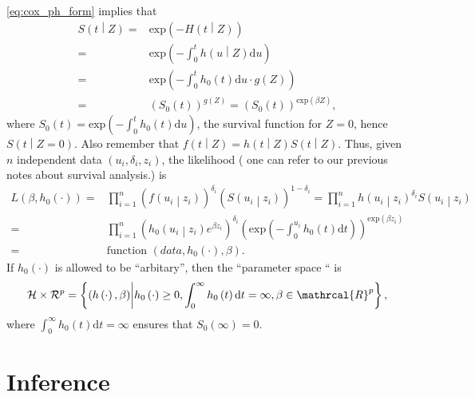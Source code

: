 \documentclass[a4paper,12pt]{article}
\begin{document}
\eqref{eq:cox_ph_form} implies that
\[
  \begin{aligned}
    S\left(t\middle|Z\right)
    =& \mathrm{exp}\left(-H\left(t\middle|Z\right)\right)    \\
    =& \mathrm{exp}\left(-\int_0^th\left(u\middle|Z\right)\mathrm{d}u\right)    \\
    =& \mathrm{exp}\left(-\int_0^th_0\left(t\right)\mathrm{d}u \cdot g\left(Z\right)\right)    \\
    =& \left(S_0\left(t\right)\right)^{g\left(Z\right)}
    = \left(S_0\left(t\right)\right)^{\mathrm{exp}\left(\beta Z\right)}
    ,
  \end{aligned}
\]
where $S_0\left(t\right) = \mathrm{exp}\left( - \int_0^t h_0\left(t\right)\mathrm{d}u\right)$, the survival function for $Z = 0$, hence $S\left(t\middle|Z = 0\right)$. Also remember that $f\left(t\middle|Z\right) = h\left(t\middle|Z\right) S\left(t\middle|Z\right)$. Thus, given $n$ independent data $\left(u_i, \delta_i, z_i\right)$, the likelihood ({\color{blue} one can refer to our previous notes about survival analysis.}) is
\[
  \begin{aligned}
    L\left(\beta, h_0\left(\cdot\right)\right)
    =& \prod\limits_{i = 1}^n
       \left(
       f\left(u_i\middle|z_i\right)
       \right)^{\delta_i}
       \left(
       S\left(u_i\middle|z_i\right)
       \right)^{1 - \delta_i}
       = \prod\limits_{i = 1}^n
       h\left(u_i\middle|z_i\right)^{\delta_i}
       S\left(u_i\middle|z_i\right)    \\
    =& \prod\limits_{i = 1}^n
       \left(
       h_0\left(u_i\middle|z_i\right)
       e^{\beta z_i}
       \right)^{\delta_i}
       \left(
       \mathrm{exp}\left(-\int_0^{u_i}h_0\left(t\right)\mathrm{d}t\right)
       \right)^{\mathrm{exp}\left(\beta z_i\right)}    \\
    =& \text{function $\left(data, h_0\left(\cdot\right), \beta\right)$}.
  \end{aligned}
\]
If $h_0\left(\cdot\right)$ is allowed to be ``arbitary'', then the ``parameter space `` is
\[
  \mathcal{H} \times \mathcal{R}^p
  = \left\{
    \left(h\left(\cdot\right), \beta\right)
    \middle|
    h_0\left(\cdot\right) \geq 0,
    \int_0^\infty h_0\left(t\right)\mathrm{d}t = \infty,
    \beta \in \mathrcal{R}^p
  \right\}
  ,
\]
where $\int_0^\infty h_0\left(t\right)\mathrm{d}t = \infty$ ensures that $S_0\left(\infty\right) = 0$.



\section{Inference}
\label{sec:inference}







\end{document}

